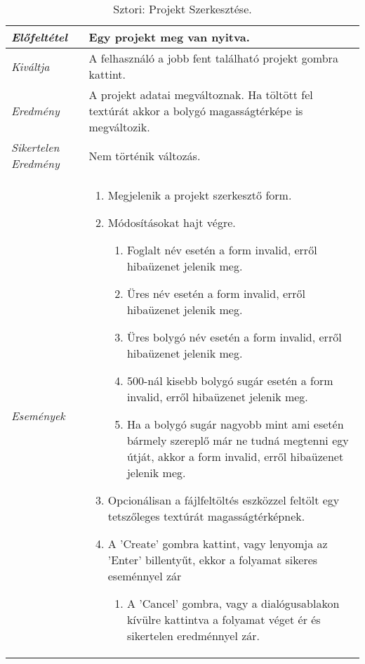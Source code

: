 \begin{table}[H]
	\centering
	\begin{tabular}{ | m{} | m{} | }
		\hline
		\emph{Előfeltétel} & Egy projekt meg van nyitva.  \\
		\hline
		\emph{Kiváltja} & A felhasználó a jobb fent található projekt gombra kattint. \\
		\hline
		\emph{Eredmény} & A projekt adatai megváltoznak. Ha töltött fel textúrát akkor a bolygó magasságtérképe is megváltozik.    \\
		\hline
		\emph{Sikertelen Eredmény} & Nem történik változás.  \\
		\hline
		\hline
		\emph{Események} &

		\begin{enumerate}[itemsep=-1ex]
			\item Megjelenik a projekt szerkesztő form.
			\item Módosításokat hajt végre.
			\begin{enumerate}[itemsep=-1ex]
				\item Foglalt név esetén a form invalid, erről hibaüzenet jelenik meg.
				\item Üres név esetén a form invalid, erről hibaüzenet jelenik meg.
				\item Üres bolygó név esetén a form invalid, erről hibaüzenet jelenik meg.
				\item 500-nál kisebb bolygó sugár esetén a form invalid, erről hibaüzenet jelenik meg.
				\item Ha a bolygó sugár nagyobb mint ami esetén bármely szereplő már ne tudná megtenni egy útját, akkor a form invalid, erről hibaüzenet jelenik meg.
			\end{enumerate}
			\item Opcionálisan a fájlfeltöltés eszközzel feltölt egy tetszőleges textúrát magasságtérképnek.
			\item A 'Create' gombra kattint, vagy lenyomja az 'Enter' billentyűt, ekkor a folyamat sikeres eseménnyel zár
			\begin{enumerate}[itemsep=-1ex]
				\item A 'Cancel' gombra, vagy a dialógusablakon kívülre kattintva a folyamat véget ér és sikertelen eredménnyel zár.
			\end{enumerate}
		\end{enumerate}

		\\
		\hline
	\end{tabular}
	\caption{Sztori: Projekt Szerkesztése.}
	\label{tab:story-project-edit}
\end{table}


